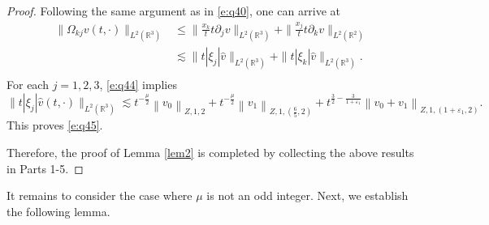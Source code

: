 \documentclass[11pt,twoside]{article}
\newcommand{\R}{\mathbb R}
\newcommand{\p}{\partial}
\newcommand{\f}{\frac}
\theoremstyle{plain}
\theoremstyle{definition}
\theoremstyle{remark}
\numberwithin{equation}{section}
\begin{document}
\begin{proof}
Following the same argument as in \eqref{e:q40}, one can arrive at
\begin{equation}\label{e:q46''}
\begin{aligned}
\|\Omega_{kj}v(t, \cdot)\|_{L^2(\R^3)}&\leq \|\f{x_k}{t}t\p_jv\|_{L^2(\R^3)}+\|\f{x_j}{t}t\p_kv\|_{L^2(\R^2)}\\
& \lesssim \|t|\xi_j|\hat{v}\|_{L^2(\R^3)}+\|t|\xi_k|\hat{v}\|_{L^2(\R^3)}.\\
\end{aligned}
\end{equation}
For each $j=1,2,3$, \eqref{e:q44} implies
$$
\|t|\xi_j|\hat{v}(t, \cdot)\|_{L^2(\R^3)} \lesssim t^{-\f{\mu}{2}}\left\|v_0\right\|_{Z, 1, 2}+t^{-\f{\mu}{2}}\left\|v_1\right\|_{Z, 1,(\f65, 2)}+t^{\f32-\f{3}{1+\varepsilon_1}}\left\|v_0+v_1\right\|_{Z, 1,(1+\varepsilon_1, 2)}.
$$
This proves \eqref{e:q45}.

Therefore, the proof of Lemma \ref{lem2} is completed by collecting the above results in Parts 1-5.
\end{proof}


It remains to consider the case where $\mu$ is not an odd integer. Next, we  establish the following lemma.
\end{document}
